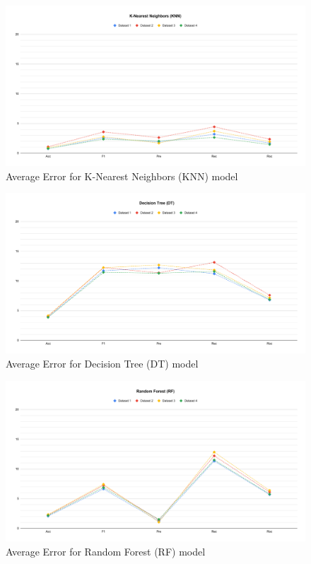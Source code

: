 \documentclass[a4paper,fleqn]{cas-dc}
\begin{document}
\begin{figure}[ht]
    \centering
    \includegraphics[width=1.9\columnwidth]{delta_KNN.pdf}
    \caption{Average Error for K-Nearest Neighbors (KNN) model} \label{fig:perfromance_delta_knn}
\end{figure}

\begin{figure}[ht]
    \centering
    \includegraphics[width=1.9\columnwidth]{delta_DT.pdf}
    \caption{Average Error for Decision Tree (DT) model} \label{fig:perfromance_delta_dt}
\end{figure}

\begin{figure}[ht]
    \centering
    \includegraphics[width=1.9\columnwidth]{delta_RF.pdf}
    \caption{Average Error for Random Forest (RF) model} \label{fig:perfromance_delta_rf}
\end{figure}
\end{document}
